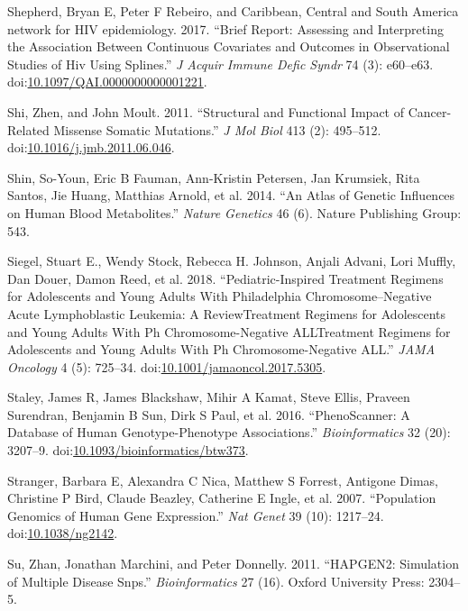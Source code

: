 \documentclass[]{DissertateOSU}
\begin{document}
\hypertarget{ref-shepherd_2017}{}
Shepherd, Bryan E, Peter F Rebeiro, and Caribbean, Central and South
America network for HIV epidemiology. 2017. ``Brief Report: Assessing
and Interpreting the Association Between Continuous Covariates and
Outcomes in Observational Studies of Hiv Using Splines.'' \emph{J Acquir
Immune Defic Syndr} 74 (3): e60--e63.
doi:\href{https://doi.org/10.1097/QAI.0000000000001221}{10.1097/QAI.0000000000001221}.

\hypertarget{ref-shi_2011}{}
Shi, Zhen, and John Moult. 2011. ``Structural and Functional Impact of
Cancer-Related Missense Somatic Mutations.'' \emph{J Mol Biol} 413 (2):
495--512.
doi:\href{https://doi.org/10.1016/j.jmb.2011.06.046}{10.1016/j.jmb.2011.06.046}.

\hypertarget{ref-shin_2014}{}
Shin, So-Youn, Eric B Fauman, Ann-Kristin Petersen, Jan Krumsiek, Rita
Santos, Jie Huang, Matthias Arnold, et al. 2014. ``An Atlas of Genetic
Influences on Human Blood Metabolites.'' \emph{Nature Genetics} 46 (6).
Nature Publishing Group: 543.

\hypertarget{ref-siegel_2018}{}
Siegel, Stuart E., Wendy Stock, Rebecca H. Johnson, Anjali Advani, Lori
Muffly, Dan Douer, Damon Reed, et al. 2018. ``Pediatric-Inspired
Treatment Regimens for Adolescents and Young Adults With Philadelphia
Chromosome--Negative Acute Lymphoblastic Leukemia: A ReviewTreatment
Regimens for Adolescents and Young Adults With Ph Chromosome-Negative
ALLTreatment Regimens for Adolescents and Young Adults With Ph
Chromosome-Negative ALL.'' \emph{JAMA Oncology} 4 (5): 725--34.
doi:\href{https://doi.org/10.1001/jamaoncol.2017.5305}{10.1001/jamaoncol.2017.5305}.

\hypertarget{ref-staley_2016}{}
Staley, James R, James Blackshaw, Mihir A Kamat, Steve Ellis, Praveen
Surendran, Benjamin B Sun, Dirk S Paul, et al. 2016. ``PhenoScanner: A
Database of Human Genotype-Phenotype Associations.''
\emph{Bioinformatics} 32 (20): 3207--9.
doi:\href{https://doi.org/10.1093/bioinformatics/btw373}{10.1093/bioinformatics/btw373}.

\hypertarget{ref-stranger_2007}{}
Stranger, Barbara E, Alexandra C Nica, Matthew S Forrest, Antigone
Dimas, Christine P Bird, Claude Beazley, Catherine E Ingle, et al. 2007.
``Population Genomics of Human Gene Expression.'' \emph{Nat Genet} 39
(10): 1217--24.
doi:\href{https://doi.org/10.1038/ng2142}{10.1038/ng2142}.

\hypertarget{ref-hapgen2}{}
Su, Zhan, Jonathan Marchini, and Peter Donnelly. 2011. ``HAPGEN2:
Simulation of Multiple Disease Snps.'' \emph{Bioinformatics} 27 (16).
Oxford University Press: 2304--5.
\end{document}
